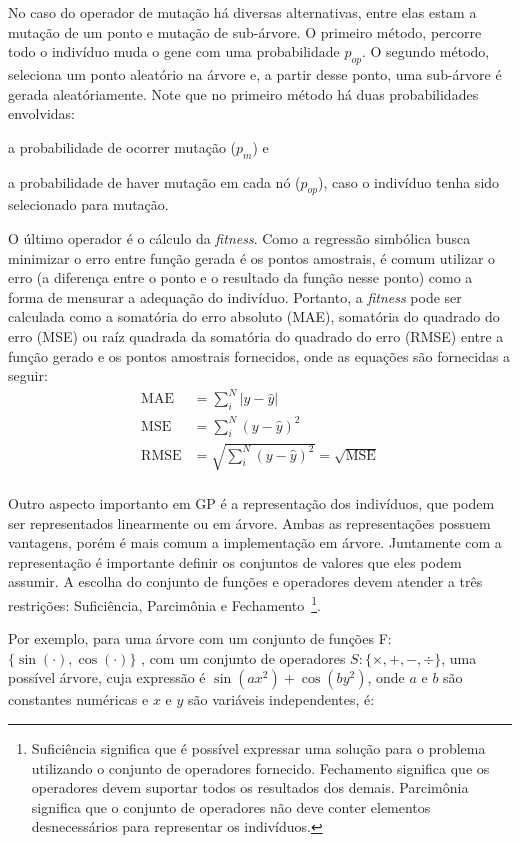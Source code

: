 \documentclass[a4paper]{paper}
\begin{document}
No caso do operador de mutação há diversas alternativas, entre elas estam a
mutação de um ponto e mutação de sub-árvore. O primeiro método, percorre todo o
indivíduo muda o gene com uma probabilidade $p_{op}$. O segundo método, seleciona
um ponto aleatório na árvore e, a partir desse ponto, uma sub-árvore é gerada
aleatóriamente. Note que no primeiro método há duas probabilidades envolvidas:
\begin{ilist}
\item a probabilidade de ocorrer mutação ($p_m$) e
\item a probabilidade de haver mutação em cada nó ($p_{op}$), caso o indivíduo
  tenha sido selecionado para mutação.
\end{ilist}

O último operador é o cálculo da \textit{fitness}. Como a regressão simbólica
busca minimizar o erro entre função gerada é os pontos amostrais, é comum
utilizar o erro (a diferença entre o ponto e o resultado da função nesse ponto)
como a forma de mensurar a adequação do indivíduo. Portanto, a \textit{fitness}
pode ser calculada como a somatória do erro absoluto (MAE), somatória do
quadrado do erro (MSE) ou raíz quadrada da somatória do quadrado do erro (RMSE)
entre a função gerado e os pontos amostrais fornecidos, onde as equações são
fornecidas a seguir:
\begin{align*}
  \textrm{MAE} &= \sum_{i}^{N}|y-\hat{y}| \\
  \textrm{MSE} &= \sum_{i}^{N}(y-\hat{y})^2 \\
  \textrm{RMSE} &= \sqrt{\sum_{i}^{N}(y-\hat{y})^2} = \sqrt{\textrm{MSE}}\\
\end{align*}

Outro aspecto importanto em GP é a representação dos indivíduos, que podem ser
representados linearmente ou em árvore. Ambas as representações possuem
vantagens, porém é mais comum a implementação em árvore. Juntamente com a
representação é importante definir os conjuntos de valores que eles podem
assumir. A escolha do conjunto de funções e operadores devem atender a três
restrições: Suficiência, Parcimônia e Fechamento~\footnote{Suficiência significa
que é possível expressar uma solução para o problema utilizando o conjunto de
operadores fornecido. Fechamento significa que os operadores devem suportar
todos os resultados dos demais. Parcimônia significa que o conjunto de
operadores não deve conter elementos desnecessários para representar os
indivíduos.}.

Por exemplo, para uma árvore com um conjunto de funções F:
$\{\sin(\cdot),\cos(\cdot)\}$ , com um conjunto de operadores $S: \{\times, + ,
-, \div\}$, uma possível árvore, cuja expressão é $\sin(ax^2)+\cos(by^2)$, onde
$a$ e $b$ são constantes numéricas e $x$ e $y$ são variáveis independentes, é:
\end{document}
